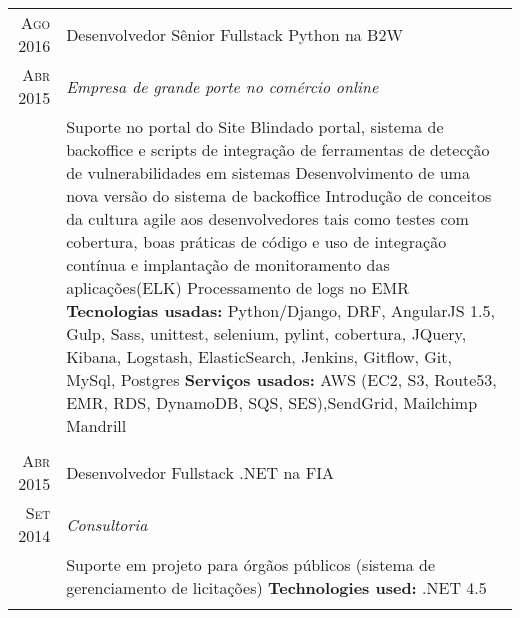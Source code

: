 \documentclass[a4paper,10pt]{article}
\begin{document}
\begin{tabular}{r|p{11cm}}
 \textsc{Ago 2016} & Desenvolvedor Sênior Fullstack Python na \textsc{B2W} \\\textsc{Abr 2015}&\emph{Empresa de grande porte no comércio online }\\&\footnotesize{
  Suporte no portal do Site Blindado portal, sistema de backoffice e scripts de integração de ferramentas de detecção de vulnerabilidades em sistemas\newline
  Desenvolvimento de uma nova versão do sistema de backoffice\newline
  Introdução de conceitos da cultura agile aos desenvolvedores tais como testes com cobertura, boas práticas de código e uso de integração contínua e implantação de monitoramento das aplicações(ELK) \newline
  Processamento de logs no EMR\newline    
\textbf{Tecnologias usadas:} Python/Django, DRF, AngularJS 1.5, Gulp, Sass, unittest, selenium, pylint, cobertura, JQuery, Kibana, Logstash, ElasticSearch, Jenkins, Gitflow, Git, MySql, Postgres\newline
\textbf{Serviços usados:} AWS (EC2, S3, Route53, EMR, RDS, DynamoDB, SQS, SES),SendGrid, Mailchimp Mandrill}\\\multicolumn{2}{c}{} \\

\textsc{Abr 2015}  & Desenvolvedor Fullstack .NET na \textsc{FIA} \\
\textsc{Set 2014}&\emph{Consultoria}\\&\footnotesize{Suporte em projeto para órgãos públicos (sistema de gerenciamento de licitações)\newline
\textbf{Technologies used:} .NET 4.5 
 }\\\multicolumn{2}{c}{} \\

 
 \end{tabular}
 \newpage
\end{document}
